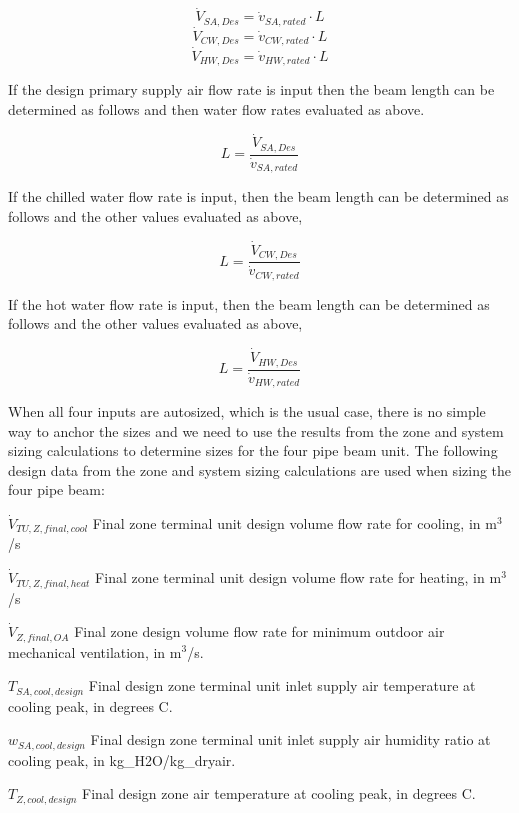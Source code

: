 \[{\dot V_{SA,Des}} = {{\dot v_{SA,rated}} \cdot {L} }\] \[{\dot V_{CW,Des}} = {{\dot v_{CW,rated}} \cdot {L} }\] \[{\dot V_{HW,Des}} = {{\dot v_{HW,rated}} \cdot {L} }\]

If the design primary supply air flow rate is input then the beam length can be determined as follows and then water flow rates evaluated as above.

\begin{equation}
{L} = {\frac{{\dot V_{SA,Des}}}{{\dot v_{SA,rated}}}  }
\end{equation}

If the chilled water flow rate is input, then the beam length can be determined as follows and the other values evaluated as above,

\begin{equation}
{L} = {\frac{{\dot V_{CW,Des}}}{{\dot v_{CW,rated}}}  }
\end{equation}

If the hot water flow rate is input, then the beam length can be determined as follows and the other values evaluated as above,

\begin{equation}
{L} = {\frac{{\dot V_{HW,Des}}}{{\dot v_{HW,rated}}}  }
\end{equation}

When all four inputs are autosized, which is the usual case, there is no simple way to anchor the sizes and we need to use the results from the zone and system sizing calculations to determine sizes for the four pipe beam unit. The following design data from the zone and system sizing calculations are used when sizing the four pipe beam:

\({\dot V_{TU,Z,final,cool} }\) Final zone terminal unit design volume flow rate for cooling, in m\(^{3}\)/s

\({\dot V_{TU,Z,final,heat} }\) Final zone terminal unit design volume flow rate for heating, in m\(^{3}\)/s

\({\dot V_{Z,final,OA} }\) Final zone design volume flow rate for minimum outdoor air mechanical ventilation, in m\(^{3}\)/s.

\({T_{SA,cool,design } }\) Final design zone terminal unit inlet supply air temperature at cooling peak, in degrees C.

\({w_{SA,cool,design } }\) Final design zone terminal unit inlet supply air humidity ratio at cooling peak, in kg\_H2O/kg\_dryair.

\({T_{Z,cool,design } }\) Final design zone air temperature at cooling peak, in degrees C.

